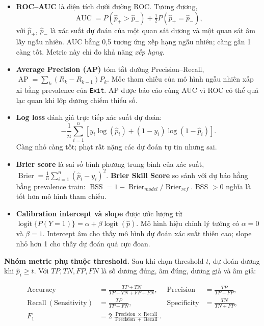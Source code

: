 \begin{itemize}
  \item \textbf{ROC--AUC} là diện tích dưới đường ROC. Tương đương,
  \[
  \operatorname{AUC} = P(\hat p_{+} > \hat p_{-}) + \tfrac{1}{2}P(\hat p_{+} = \hat p_{-}),
  \]
  với $\hat p_{+}$, $\hat p_{-}$ là xác suất dự đoán của một quan sát dương và
  một quan sát âm lấy ngẫu nhiên. AUC bằng 0,5 tương ứng xếp hạng ngẫu nhiên;
  càng gần 1 càng tốt. Metric này chỉ đo khả năng \emph{xếp hạng}.

  \item \textbf{Average Precision (AP)} tóm tắt đường Precision--Recall,
  $\operatorname{AP} = \sum_k (R_k - R_{k-1}) P_k$. Mốc tham chiếu của mô hình
  ngẫu nhiên xấp xỉ bằng prevalence của \texttt{Exit}. AP được báo cáo cùng AUC
  vì ROC có thể quá lạc quan khi lớp dương chiếm thiểu số.

  \item \textbf{Log loss} đánh giá trực tiếp xác suất dự đoán:
  \[
  -\frac{1}{n}\sum_{i=1}^{n}\left[y_i\log(\hat p_i) + (1-y_i)\log(1-\hat p_i)\right].
  \]
  Càng nhỏ càng tốt; phạt rất nặng các dự đoán tự tin nhưng sai.

  \item \textbf{Brier score} là sai số bình phương trung bình của xác suất,
  $\operatorname{Brier} = \frac{1}{n}\sum_{i=1}^{n}(\hat p_i - y_i)^2$.
  \textbf{Brier Skill Score} so sánh với dự báo hằng bằng prevalence train:
  $\operatorname{BSS} = 1 - \operatorname{Brier}_{model}/\operatorname{Brier}_{ref}$.
  BSS $> 0$ nghĩa là tốt hơn mô hình tham chiếu.

  \item \textbf{Calibration intercept và slope} được ước lượng từ
  $\operatorname{logit}\{P(Y=1)\} = \alpha + \beta\operatorname{logit}(\hat p)$.
  Mô hình hiệu chỉnh lý tưởng có $\alpha = 0$ và $\beta = 1$. Intercept âm cho
  thấy mô hình dự đoán xác suất thiên cao; slope nhỏ hơn 1 cho thấy dự đoán quá
  cực đoan.
\end{itemize}

\textbf{Nhóm metric phụ thuộc threshold.} Sau khi chọn threshold $t$, dự đoán
dương khi $\hat p_i \geq t$. Với $TP, TN, FP, FN$ là số dương đúng, âm đúng,
dương giả và âm giả:

\[
\begin{aligned}
\operatorname{Accuracy} &= \frac{TP+TN}{TP+TN+FP+FN}, &
\operatorname{Precision} &= \frac{TP}{TP+FP}, \\
\operatorname{Recall\ (Sensitivity)} &= \frac{TP}{TP+FN}, &
\operatorname{Specificity} &= \frac{TN}{TN+FP}, \\
F_1 &= 2\,\frac{\operatorname{Precision}\times\operatorname{Recall}}
{\operatorname{Precision}+\operatorname{Recall}}. & &
\end{aligned}
\]

